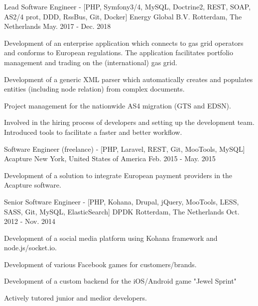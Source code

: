 \begin{cventries}
  \cventry
    {Lead Software Engineer - [PHP, Symfony3/4, MySQL, Doctrine2, REST, SOAP, AS2/4 prot, DDD, RssBus, Git, Docker]} %
    {Energy Global B.V.} %
    {Rotterdam, The Netherlands} %
    {May. 2017 - Dec. 2018} %
    {
      \begin{cvitems} %
      	\item {Development of an enterprise application which connects to gas grid operators and conforms to European regulations. \newline The application facilitates portfolio management and trading on the (international) gas grid.}
        \item {Development of a generic XML parser which automatically creates and populates entities (including node relation) from complex documents.}
        \item {Project management for the nationwide AS4 migration (GTS and EDSN).}
        \item {Involved in the hiring process of developers and setting up the development team. Introduced tools to facilitate a faster and better workflow.}
      \end{cvitems}
    }

  \cventry
    {Software Engineer (freelance) - [PHP, Laravel, REST, Git, MooTools, MySQL]} %
    {Acapture} %
    {New York, United States of America} %
    {Feb. 2015 - May. 2015} %
    {
      \begin{cvitems} %
        \item {Development of a solution to integrate European payment providers in the Acapture software.}
      \end{cvitems}
    }
    
  \cventry
    {Senior Software Engineer - [PHP, Kohana, Drupal, jQuery, MooTools, LESS, SASS, Git, MySQL, ElasticSearch]} %
    {DPDK} %
    {Rotterdam, The Netherlands} %
    {Oct. 2012 - Nov. 2014} %
    {
      \begin{cvitems} %
        \item {Development of a social media platform using Kohana framework and node.js/socket.io.}
        \item {Development of various Facebook games for customers/brands.}
        \item {Development of a custom backend for the iOS/Android game "Jewel Sprint"}
        \item {Actively tutored junior and medior developers.}
      \end{cvitems}
    }


\end{cventries}

